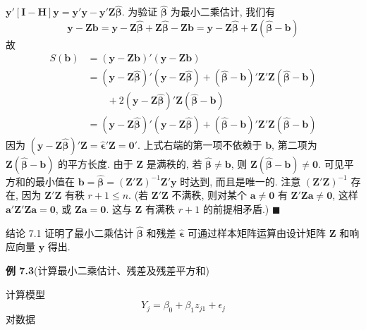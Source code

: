 
$\mathbf{y}'[\mathbf{I}-\mathbf{H}]\mathbf{y}=\mathbf{y}'\mathbf{y}-\mathbf{y}'\mathbf{Z}\hat{\boldsymbol{\beta}}$. 为验证 $\hat{\boldsymbol{\beta}}$ 为最小二乘估计, 我们有
\[
\mathbf{y}-\mathbf{Z}\mathbf{b}=\mathbf{y}-\mathbf{Z}\hat{\boldsymbol{\beta}}+\mathbf{Z}\hat{\boldsymbol{\beta}}-\mathbf{Z}\mathbf{b}=\mathbf{y}-\mathbf{Z}\hat{\boldsymbol{\beta}}+\mathbf{Z}(\hat{\boldsymbol{\beta}}-\mathbf{b})
\]
故
\[
\begin{aligned}
S(\mathbf{b})&=(\mathbf{y}-\mathbf{Z}\mathbf{b})'(\mathbf{y}-\mathbf{Z}\mathbf{b})\\
&=(\mathbf{y}-\mathbf{Z}\hat{\boldsymbol{\beta}})'(\mathbf{y}-\mathbf{Z}\hat{\boldsymbol{\beta}})+(\hat{\boldsymbol{\beta}}-\mathbf{b})'\mathbf{Z}'\mathbf{Z}(\hat{\boldsymbol{\beta}}-\mathbf{b})\\
&\qquad +2(\mathbf{y}-\mathbf{Z}\hat{\boldsymbol{\beta}})'\mathbf{Z}(\hat{\boldsymbol{\beta}}-\mathbf{b})\\
&=(\mathbf{y}-\mathbf{Z}\hat{\boldsymbol{\beta}})'(\mathbf{y}-\mathbf{Z}\hat{\boldsymbol{\beta}})+(\hat{\boldsymbol{\beta}}-\mathbf{b})'\mathbf{Z}'\mathbf{Z}(\hat{\boldsymbol{\beta}}-\mathbf{b})
\end{aligned}
\]
因为 $(\mathbf{y}-\mathbf{Z}\hat{\boldsymbol{\beta}})'\mathbf{Z}=\hat{\boldsymbol{\epsilon}}'\mathbf{Z}=\mathbf{0}'$. 上式右端的第一项不依赖于 $\mathbf{b}$, 第二项为 $\mathbf{Z}(\hat{\boldsymbol{\beta}}-\mathbf{b})$ 的平方长度. 由于 $\mathbf{Z}$ 是满秩的, 若 $\hat{\boldsymbol{\beta}}\neq\mathbf{b}$, 则 $\mathbf{Z}(\hat{\boldsymbol{\beta}}-\mathbf{b})\neq\mathbf{0}$. 可见平方和的最小值在 $\mathbf{b}=\hat{\boldsymbol{\beta}}=(\mathbf{Z}'\mathbf{Z})^{-1}\mathbf{Z}'\mathbf{y}$ 时达到, 而且是唯一的. 注意 $(\mathbf{Z}'\mathbf{Z})^{-1}$ 存在, 因为 $\mathbf{Z}'\mathbf{Z}$ 有秩 $r+1\leq n$. (若 $\mathbf{Z}'\mathbf{Z}$ 不满秩, 则对某个 $\mathbf{a}\neq\mathbf{0}$ 有 $\mathbf{Z}'\mathbf{Z}\mathbf{a}\neq\mathbf{0}$, 这样 $\mathbf{a}'\mathbf{Z}'\mathbf{Z}\mathbf{a}=\mathbf{0}$, 或 $\mathbf{Z}\mathbf{a}=\mathbf{0}$. 这与 $\mathbf{Z}$ 有满秩 $r+1$ 的前提相矛盾.) \hfill$\blacksquare$

结论 7.1 证明了最小二乘估计 $\hat{\boldsymbol{\beta}}$ 和残差 $\hat{\boldsymbol{\epsilon}}$ 可通过样本矩阵运算由设计矩阵 $\mathbf{Z}$ 和响应向量 $\mathbf{y}$ 得出.

\medskip
\noindent\textbf{例 7.3}\quad (计算最小二乘估计、残差及残差平方和)

计算模型
\[
Y_j=\beta_0+\beta_1 z_{j1}+\epsilon_j
\]
对数据

